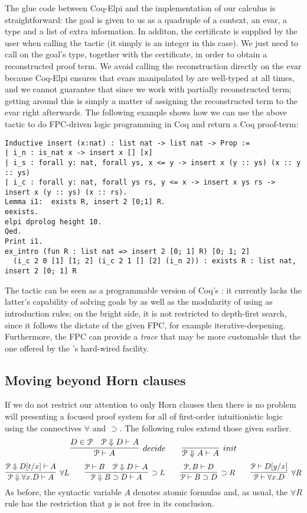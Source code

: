 The glue code between Coq-Elpi and the implementation of our calculus is
straightforward: the goal is given to us as a quadruple of a context, an
evar, a type and a list of extra information. In additon, the certificate is
supplied by the user when calling the tactic (it simply is an integer in this
case). We just need to call  on the goal's type, together with
the certificate, in order to obtain a reconstructed proof term. We avoid
calling the reconstruction directly on the evar because Coq-Elpi ensures that
evars manipulated by \lP are well-typed at all times, and we cannot guarantee
that since we work with partially reconstructed term; getting around this is
simply a matter of assigning the reconstructed term to the evar right
afterwards.
The following example shows how we can use the above tactic to do
FPC-driven logic programming in Coq and return a Coq proof-term:
\begin{lstlisting}
Inductive insert (x:nat) : list nat -> list nat -> Prop :=
| i_n : is_nat x -> insert x [] [x]
| i_s : forall y: nat, forall ys, x <= y -> insert x (y :: ys) (x :: y :: ys)
| i_c : forall y: nat, forall ys rs, y <= x -> insert x ys rs -> insert x (y :: ys) (x :: rs).
Lemma i1:  exists R, insert 2 [0;1] R.
eexists.
elpi dprolog height 10.
Qed.
Print i1.
ex_intro (fun R : list nat => insert 2 [0; 1] R) [0; 1; 2]
  (i_c 2 0 [1] [1; 2] (i_c 2 1 [] [2] (i_n 2)) : exists R : list nat, insert 2 [0; 1] R
\end{lstlisting}

The  tactic can be seen as a programmable version of
Coq's : it currently lacks the latter's capability of
solving goals by  as well as the modularity of using
 as introduction rules; on the bright side, it is not
restricted to depth-first search, since it follows the dictate of the
given FPC, for example iterative-deepening. Furthermore, the FPC can
provide a \emph{trace} that may be more customable that the one
offered by the 's hard-wired  facility.

\subsection{Moving beyond Horn clauses}
\label{ssec:beyond}

If we do not restrict our attention to only Horn clauses then there is
no problem will presenting a focused proof system for all of
first-order intuitionistic logic using the connectives $\forall$ and
$\supset$. The following rules extend those given earlier.
\[
  \infer[decide]{\Pscr\vdash A}{D \in \Pscr\quad \Pscr\Downarrow D\vdash A}
  \qquad
  \infer[init]{\Pscr\Downarrow A\vdash A}{}
\]
\[
  \infer[\forall L]{\Pscr\Downarrow\forall x. D\vdash A}
        {\Pscr\Downarrow D[t/x]\vdash A}
  \qquad
  \infer[\supset L]{\Pscr\Downarrow B\supset D\vdash A}
        {\Pscr\vdash B\quad \Pscr\Downarrow D\vdash A}
  \qquad
  \infer[\supset R]{\Pscr\vdash B\supset D}{\Pscr, B\vdash D}
  \qquad
  \infer[\forall R]{\Pscr\vdash \forall x.D}{\Pscr\vdash D[y/x]}
\]
As before, the syntactic variable $A$ denotes atomic formulas and, as
usual, the $\forall R$ rule has the restriction that $y$ is not free in
its conclusion.

